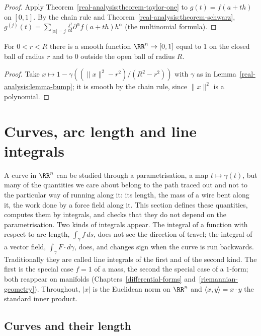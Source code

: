 \begin{proof}
Apply Theorem~\ref{real-analysis:theorem-taylor-one} to $g(t) = f(a + th)$ on $[0, 1]$. By the chain rule and Theorem~\ref{real-analysis:theorem-schwarz},
$g^{(j)}(t) = \sum_{|\alpha| = j}\frac{j!}{\alpha!}\partial^\alpha f(a + th)h^\alpha$ (the multinomial formula).
\end{proof}

\begin{corollary}\label{real-analysis:corollary-bump-function}
For $0 < r < R$ there is a smooth function $\RR^n \to [0, 1]$ equal to $1$ on the closed ball of radius $r$ and to $0$ outside the open ball of radius $R$.
\end{corollary}

\begin{proof}
Take $x \mapsto 1 - \gamma((\|x\|^2 - r^2)/(R^2 - r^2))$ with $\gamma$ as in Lemma~\ref{real-analysis:lemma-bump}; it is smooth by the chain rule, since $\|x\|^2$ is a polynomial.
\end{proof}

\section{Curves, arc length and line integrals}\label{real-analysis:section-curves}

A curve in $\RR^n$ can be studied through a parametrisation, a map $t \mapsto \gamma(t)$, but many of the quantities we care about belong to the path traced out and not to the particular way of running
along it: its length, the mass of a wire bent along it, the work done by a force field along it. This section defines these quantities, computes them by integrals, and checks that they do not
depend on the parametrisation. Two kinds of integrals appear. The integral of a function with respect to arc length, $\int_\gamma f\,ds$, does not see the direction of travel; the integral of a vector
field, $\int_\gamma F \cdot d\gamma$, does, and changes sign when the curve is run backwards. Traditionally they are called line integrals of the first and of the second kind. The first is the special case
$f = 1$ of a mass, the second the special case of a $1$-form; both reappear on manifolds (Chapters~\ref{differential-forms} and~\ref{riemannian-geometry}). Throughout, $|x|$ is the Euclidean norm on $\RR^n$ and
$\langle x, y\rangle = x \cdot y$ the standard inner product.

\subsection{Curves and their length}\label{real-analysis:subsection-curve-length}


